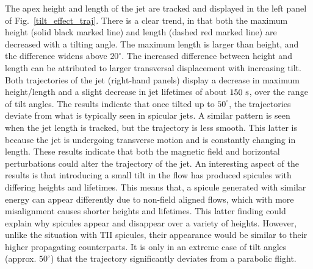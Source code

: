 The apex height and length of the jet are tracked and displayed in the left panel of Fig.~\ref{tilt_effect_traj}. There is a clear trend, in that both the maximum height (solid black marked line) and length (dashed red marked line) are decreased with a tilting angle. The maximum length is larger than height, and the difference widens above $20^{\circ}$. The increased difference between height and length can be attributed to larger transversal displacement with increasing tilt. Both trajectories of the jet (right-hand panels) display a decrease in maximum height/length and a slight decrease in jet lifetimes of about $150~\rm{s}$, over the range of tilt angles. The results indicate that once tilted up to $50^{\circ}$, the trajectories deviate from what is typically seen in spicular jets. A similar pattern is seen when the jet length is tracked, but the trajectory is less smooth. This latter is because the jet is undergoing transverse motion and is constantly changing in length. These results indicate that both the magnetic field and horizontal perturbations could alter the trajectory of the jet. \np 
%
An interesting aspect of the results is that introducing a small tilt in the flow has produced spicules with differing heights and lifetimes. This means that, a spicule generated with similar energy can appear differently due to non-field aligned flows, which with more misalignment causes shorter heights and lifetimes. This latter finding could explain why spicules appear and disappear over a variety of heights. However, unlike the situation with TII spicules, their appearance would be similar to their higher propagating counterparts. It is only in an extreme case of tilt angles (approx. $50^{\circ}$) that the trajectory significantly deviates from a parabolic flight.
%

